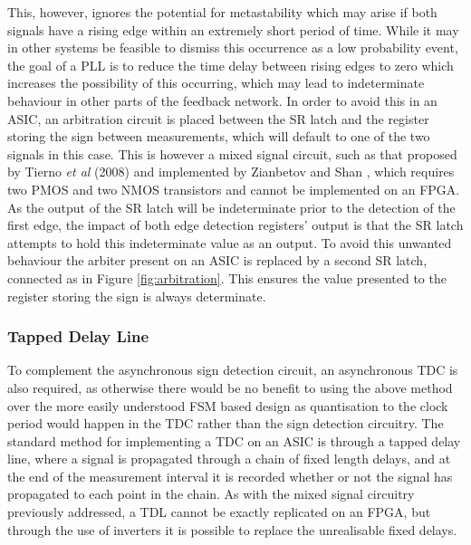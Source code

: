 This, however, ignores the potential for metastability which may arise if both signals have a rising edge within an extremely short period of time. While it may in other systems be feasible to dismiss this occurrence as a low probability event, the goal of a \ac{PLL} is to reduce the time delay between rising edges to zero which increases the possibility of this occurring, which may lead to indeterminate behaviour in other parts of the feedback network. In order to avoid this in an \ac{ASIC}, an arbitration circuit is placed between the \ac{SR} latch and the register storing the sign between measurements, which will default to one of the two signals in this case. This is however a mixed signal circuit, such as that proposed by Tierno \textit{et al} (2008) and implemented by Zianbetov and Shan \cite{tierno2008wide,zianbetov2013phd,shan2014phd}, which requires two \ac{PMOS} and two \ac{NMOS} transistors and cannot be implemented on an \ac{FPGA}. As the output of the \ac{SR} latch will be indeterminate prior to the detection of the first edge, the impact of both edge detection registers' output is that the \ac{SR} latch attempts to hold this indeterminate value as an output. To avoid this unwanted behaviour the arbiter present on an \ac{ASIC} is replaced by a second \ac{SR} latch, connected as in Figure \ref{fig:arbitration}. This ensures the value presented to the register storing the sign is always determinate.

\subsubsection{Tapped Delay Line}
To complement the asynchronous sign detection circuit, an asynchronous \ac{TDC} is also required, as otherwise there would be no benefit to using the above method over the more easily understood \ac{FSM} based design as quantisation to the clock period would happen in the \ac{TDC} rather than the sign detection circuitry. The standard method for implementing a \ac{TDC} on an \ac{ASIC} is through a tapped delay line, where a signal is propagated through a chain of fixed length delays, and at the end of the measurement interval it is recorded whether or not the signal has propagated to each point in the chain. As with the mixed signal circuitry previously addressed, a \ac{TDL} cannot be exactly replicated on an \ac{FPGA}, but through the use of inverters it is possible to replace the unrealisable fixed delays.



